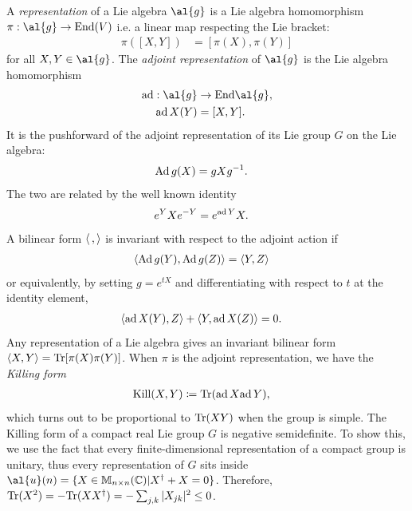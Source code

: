 A \emph{representation} of a Lie algebra $\al{g}$ is a Lie algebra homomorphism $\pi: \al{g} \to \text{End}(V)$ i.e. a linear map respecting the Lie bracket:
\begin{align}
\pi([X,Y]) &= [\pi(X),\pi(Y)]
\end{align}
for all $X,Y \in \al{g}$. The \emph{adjoint representation} of $\al{g}$ is the Lie algebra homomorphism
\begin{align}
\text{ad}: \al{g} &\to \text{End}\al{g}, \\
\adrep X (Y) &= [X,Y].
\end{align}
It is the pushforward of the adjoint representation of its Lie group $G$ on the Lie algebra:
\begin{align}
\text{Ad}\, g (X) &= gXg^{-1}.
\end{align}
The two are related by the well known identity
\begin{align}
	e^Y X e^{-Y} &= e^{\text{ad}\,{Y}} X.
\end{align}
A bilinear form $\braket{\, , \,}$ is invariant with respect to the adjoint action if
\begin{align}
\braket{ \text{Ad}\, g (Y), \text{Ad}\, g (Z)} &= \braket{Y,Z}
\end{align}
or equivalently, by setting $g=e^{tX}$ and differentiating with respect to $t$
at the identity element,
\begin{align}
\braket{\text{ad}\, X (Y),Z} + \braket{Y,\text{ad}\, X (Z)} &= 0.
\end{align}
Any representation of a Lie algebra gives an invariant bilinear form $\braket{X,Y} =\\ \mathrm{Tr} [\pi(X) \pi(Y)]$. When $\pi$ is the adjoint representation, we have the \emph{Killing form}
\begin{align}\label{def:killing-form}
\kil{X}{Y} &\coloneqq \Tr (\adrep X \adrep Y),
\end{align}
which turns out to be proportional to $\mathrm{Tr} (XY)$ when the group is simple.
The Killing form of a compact real Lie group $G$ is negative semidefinite. To show this, we use the fact that every finite-dimensional representation of a compact group is unitary, thus every representation of $G$ sits inside $\al{u}(n) = \{ X \in \matc{n}{n} | X\dgg  + X = 0 \}$. Therefore, $\mathrm{Tr} (X^2) = - \mathrm{Tr}(XX^{\dagger} ) = -\sum_{j,k} |X_{jk}|^2 \le 0$.

